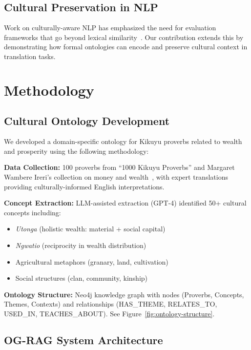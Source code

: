\documentclass[sigconf,nonacm]{acmart}
\begin{document}
\subsection{Cultural Preservation in NLP}

Work on culturally-aware NLP has emphasized the need for evaluation frameworks that go beyond lexical similarity~\cite{hershcovich2022challenges}. Our contribution extends this by demonstrating how formal ontologies can encode and preserve cultural context in translation tasks.

\section{Methodology}

\subsection{Cultural Ontology Development}

We developed a domain-specific ontology for Kikuyu proverbs related to wealth and prosperity using the following methodology:

\textbf{Data Collection:} 100 proverbs from ``1000 Kikuyu Proverbs'' and Margaret Wambere Ireri's collection on money and wealth~\cite{ireri2019proverbs}, with expert translations providing culturally-informed English interpretations.

\textbf{Concept Extraction:} LLM-assisted extraction (GPT-4) identified 50+ cultural concepts including:
\begin{itemize}
    \item \textit{Utonga} (holistic wealth: material + social capital)
    \item \textit{Ngwatio} (reciprocity in wealth distribution)
    \item Agricultural metaphors (granary, land, cultivation)
    \item Social structures (clan, community, kinship)
\end{itemize}

\textbf{Ontology Structure:} Neo4j knowledge graph with nodes (Proverbs, Concepts, Themes, Contexts) and relationships (HAS\_THEME, RELATES\_TO, USED\_IN, TEACHES\_ABOUT). See Figure~\ref{fig:ontology-structure}.

\subsection{OG-RAG System Architecture}
\end{document}
